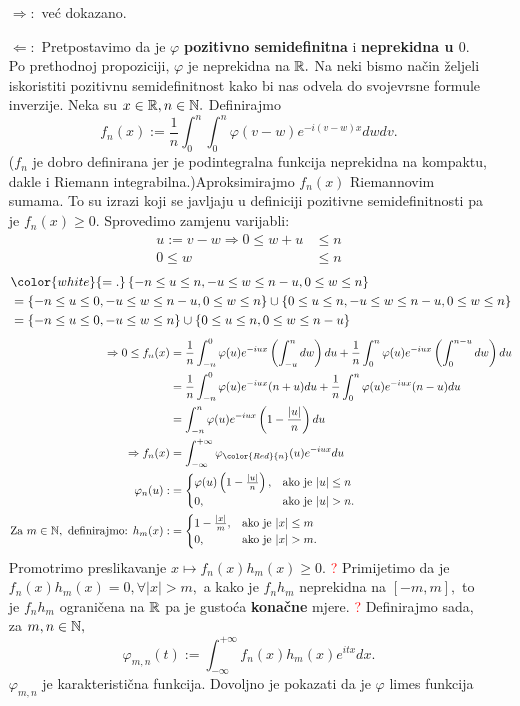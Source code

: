 \documentclass{article}
\begin{document}
\begin{itemize}
    \item[\(\boxed{\Rightarrow}:\)] već dokazano.
    \item[\(\boxed{\Leftarrow}:\)] Pretpostavimo da je \(\varphi\) \textbf{pozitivno semidefinitna} i \textbf{neprekidna u \(0\)}. Po prethodnoj propoziciji, \(\varphi\) je neprekidna na \(\Bbb R.\) Na neki bismo način željeli iskoristiti pozitivnu semidefinitnost kako bi nas odvela do svojevrsne formule inverzije. Neka su \(x\in\Bbb R,n\in\Bbb N.\) Definirajmo \[f_n(x):=\frac1n\int_0^n\int_0^n\varphi(v-w)e^{-i(v-w)x}dwdv.\] (\(f_n\) je dobro definirana jer je podintegralna funkcija neprekidna na kompaktu, dakle i Riemann integrabilna.)\newline Aproksimirajmo \(f_n(x)\) Riemannovim sumama. To su izrazi koji se javljaju u definiciji pozitivne semidefinitnosti pa je \(f_n(x)\ge 0.\) Sprovedimo zamjenu varijabli: \[\begin{aligned}u:=v-w\Rightarrow 0\le w+u&\le n\\0\le w&\le n\end{aligned}\] \[\begin{aligned}&{\color{white}{=.}}\left\{-n\le u\le n, -u\le w\le n-u,0\le w\le n\right\}\\&=\left\{-n\le u\le 0,-u\le w\le n-u,0\le w\le n\right\}\cup\left\{0\le u\le n,-u\le w\le n-u,0\le w\le n\right\}\\&=\left\{-n\le u\le 0,-u\le w\le n\right\}\cup\left\{0\le u\le n,0\le w\le n-u\right\}\end{aligned}\] \[\begin{aligned}\Rightarrow 0\le f_n(x)&=\frac1n\int_{-n}^0\varphi(u)e^{-iux}\left(\int_{-u}^ndw\right)du+\frac1n\int_0^n\varphi(u)e^{-iux}\left(\int_0^{n-u}dw\right)du\\&=\frac1n\int_{-n}^0\varphi(u)e^{-iux}(n+u)du+\frac1n\int_0^n\varphi(u)e^{-iux}(n-u)du\\&=\int_{-n}^n\varphi(u)e^{-iux}\left(1-\frac{|u|}n\right)du\\\Rightarrow f_n(x)&=\int_{-\infty}^{+\infty}\varphi_{\color{Red}{n}}(u)e^{-iux}du\\\varphi_n(u):&=\begin{cases}\varphi(u)\left(1-\frac{|u|}n\right),&\text{ako je }|u|\le n\\0,&\text{ako je }|u|>n.\end{cases}\\\text{Za }m\in\Bbb N,\text{ definirajmo: }h_m(x):&=\begin{cases}1-\frac{|x|}m,&\text{ako je }|x|\le m\\0,&\text{ako je }|x|>m.\end{cases}\end{aligned}\] Promotrimo preslikavanje \(x\mapsto f_n(x)h_m(x)\ge 0.\) \textcolor{Red}{?} Primijetimo da je \(f_n(x)h_m(x)=0,\forall |x|>m,\) a kako je \(f_nh_m\) neprekidna na \([-m,m],\) to je \(f_nh_m\) ograničena na \(\Bbb R\) pa je gustoća \textbf{konačne} mjere. \textcolor{Red}{?} Definirajmo sada, za \(m,n\in\Bbb N,\) \[\varphi_{m,n}(t):=\int_{-\infty}^{+\infty}f_n(x)h_m(x)e^{itx}dx.\] \(\varphi_{m,n}\) je karakteristična funkcija. Dovoljno je pokazati da je \(\varphi\) limes funkcija 
\end{itemize}
\end{document}
